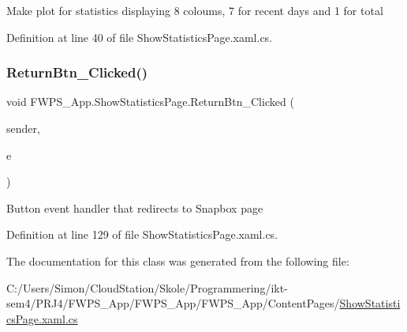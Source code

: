 Make plot for statistics displaying 8 coloums, 7 for recent days and 1 for total 

Definition at line 40 of file Show\+Statistics\+Page.\+xaml.\+cs.

\mbox{\label{class_f_w_p_s___app_1_1_show_statistics_page_adfd741fae41b18abed0520d158d3dac2}} 
\subsubsection{\texorpdfstring{Return\+Btn\+\_\+\+Clicked()}{ReturnBtn\_Clicked()}}
{\footnotesize\ttfamily void F\+W\+P\+S\+\_\+\+App.\+Show\+Statistics\+Page.\+Return\+Btn\+\_\+\+Clicked (\begin{DoxyParamCaption}\item[{object}]{sender,  }\item[{Event\+Args}]{e }\end{DoxyParamCaption})\hspace{0.3cm}{\ttfamily [private]}}

Button event handler that redirects to Snapbox page 

Definition at line 129 of file Show\+Statistics\+Page.\+xaml.\+cs.



The documentation for this class was generated from the following file\+:\begin{DoxyCompactItemize}
\item 
C\+:/\+Users/\+Simon/\+Cloud\+Station/\+Skole/\+Programmering/ikt-\/sem4/\+P\+R\+J4/\+F\+W\+P\+S\+\_\+\+App/\+F\+W\+P\+S\+\_\+\+App/\+F\+W\+P\+S\+\_\+\+App/\+Content\+Pages/\mbox{\hyperlink{_show_statistics_page_8xaml_8cs}{Show\+Statistics\+Page.\+xaml.\+cs}}\end{DoxyCompactItemize}
